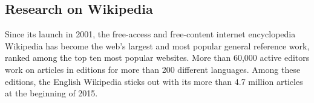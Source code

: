 \documentclass[a4paper,12pt]{scrartcl}
\begin{document}




\subsection{Research on Wikipedia}\label{sec:wikipedia}

Since its launch in 2001, the free-access and free-content internet
encyclopedia Wikipedia has become the web's largest and most popular
general reference work, ranked among the top ten most popular
websites. More than 60,000 active editors work on articles in editions
for more than 200 different languages. Among these editions, the
English Wikipedia sticks out with its more than 4.7 million
articles at the beginning of 2015.
\end{document}
